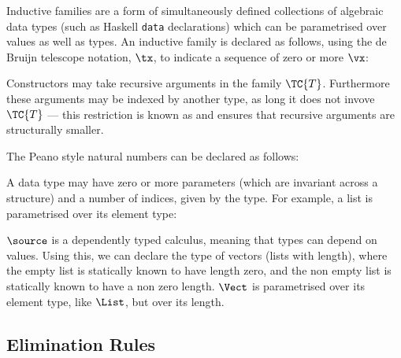 Inductive families \cite{dybjer94} are a form of simultaneously
defined collections of algebraic data types (such as Haskell
\texttt{data} declarations) which can be parametrised over values as
well as types.  An inductive family is declared as follows, using
the de Bruijn telescope notation, $\tx$, to indicate a sequence of
zero or more $\vx$:


Constructors may take recursive arguments in the family
$\TC{T}$. Furthermore these arguments may be indexed by another type,
as long it does not invove $\TC{T}$ --- this restriction is known as
 and ensures that recursive arguments are
structurally smaller.

The Peano style natural numbers can be declared as follows:

\DM{
\Data\:\Nat\Hab\Type\:=\:\Z\Hab\Nat\:\mid\:\suc\Hab\fbind{\vk}{\Nat}{\Nat}
}

A data type may have zero or more parameters (which are invariant
across a structure) and a number of indices, given by the type. For
example, a list is parametrised over its element type:

\DM{
\AR{
\Data\:\List\:(\vA\Hab\Type)\Hab\Type\\
\hg\AR{
=\:\nil\Hab\List\:\vA\\
\mid\:\cons\Hab\fbind{\vx}{\vA}{\fbind{\vxs}{\List\:\vA}{\List\:\vA}}
}
}
}

$\source$ is a dependently typed calculus, meaning that types can
depend on values. Using this, we can declare the type of vectors
(lists with length), where the empty list is statically known to have
length zero, and the non empty list is statically known to have a non
zero length. $\Vect$ is parametrised over its element type, like
$\List$, but  over its length. 

\DM{
\AR{
\Data\:\Vect\:(\vA\Hab\Type)\Hab\Nat\to\Type\\
\hg\AR{
=\:\Vnil\Hab\Vect\:\vA\:\Z\\
\mid\:\Vcons\Hab\fbind{\vk}{\Nat}{
\fbind{\vx}{\vA}{\fbind{\vxs}{\Vect\:\vA\:\vk}{\Vect\:\vA\:(\suc\:\vk)}}
}
}
}
}

\subsection{Elimination Rules}

\label{elimops}

